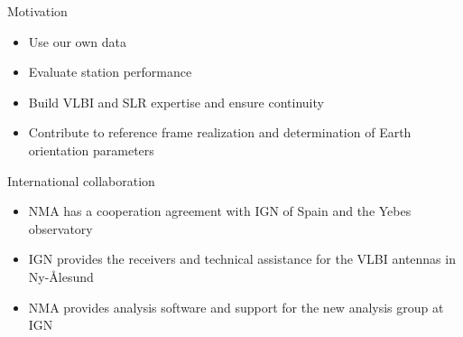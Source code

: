 \documentclass[14pt,c]{beamer}
\begin{document}
\begin{frame}{Motivation}
  \begin{itemize}
  \item Use our own data
  \item Evaluate station performance
  \item Build VLBI and SLR expertise and ensure continuity
  \item Contribute to reference frame realization and determination of Earth orientation parameters
  \end{itemize}
\end{frame}


\begin{frame}{International collaboration}
\begin{itemize}
  \item NMA has a cooperation agreement with IGN of Spain and the Yebes observatory
  \item IGN provides the receivers and technical assistance for the VLBI antennas in Ny-{\AA}lesund
  \item NMA provides analysis software and support for the new analysis group at IGN 
\end{itemize}
\end{frame}
\end{document}

